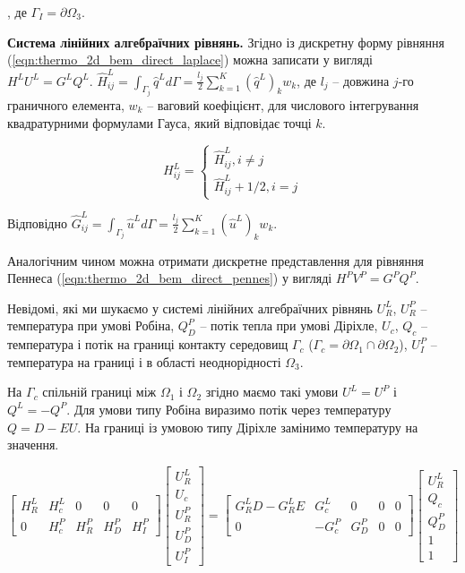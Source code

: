 \noindent, де $\Gamma_I = \partial \Omega_3$.

\textbf{Система лінійних алгебраїчних рівнянь.} Згідно із \cite{brebbia-bem} дискретну форму рівняння 
(\ref{eqn:thermo_2d_bem_direct_laplace}) можна записати у вигляді 
$H^LU^L=G^LQ^L$. $\hat{H}_{ij}^L=\int_{\Gamma_j} \hat{q}^L d \Gamma = \frac{l_j}{2} \sum_{k=1}^{K} (\hat{q}^L)_k w_k $,
де $l_j$ -- довжина $j$-го граничного елемента, $w_k$ -- ваговий коефіцієнт, для числового інтегрування квадратурними 
формулами Гауса, який відповідає точці $k$. 

$$H_{ij}^L=\begin{cases}
\hat{H}_{ij}^L, i \neq j \\
\hat{H}_{ij}^L + 1/2, i = j
\end{cases}
$$

\noindent Відповідно $\hat{G}_{ij}^L=\int_{\Gamma_j} \hat{u}^L d \Gamma = \frac{l_j}{2} 
\sum_{k=1}^{K} (\hat{u}^L)_k w_k$.

Аналогічним чином можна отримати дискретне представлення для рівняння Пеннеса (\ref{eqn:thermo_2d_bem_direct_pennes}) у 
вигляді $H^P V^P = G^P Q^P$.

Невідомі, які ми шукаємо у системі лінійних алгебраїчних рівнянь $U_R^L$, $U_R^P$ -- температура при умові Робіна, 
$Q_D^P$ -- потік тепла при умові Діріхле, $U_c$, $Q_c$ --температура і потік на границі контакту середовищ 
$\Gamma_c$ ($\Gamma_c = \partial \Omega_1 \cap \partial \Omega_2$), $U_I^P$ -- температура на границі і в області 
неоднорідності $\Omega_3$.

На $\Gamma_c$ спільній границі між $\Omega_1$ і $\Omega_2$ згідно \cite{brebbia-bem} маємо такі умови 
$U^L = U^P$ і $Q^L = -Q^P$. Для умови типу Робіна виразимо потік через температуру $Q = D - EU$. На границі із умовою 
типу Діріхле замінимо температуру на значення. 

\begin{equation*}
    \begin{bmatrix}
        H_R^L & H_c^L & 0 & 0 & 0 \\ 
        0 & H_c^P & H_R^P & H_D^P & H_I^P
    \end{bmatrix}
    \begin{bmatrix}
        U_R^L \\ 
        U_c \\
        U_R^P \\ 
        U_D^P \\ 
        U_I^P  
    \end{bmatrix} 
    = 
    \begin{bmatrix}
        G_R^LD-G_R^LE & G_c^L & 0 & 0 & 0\\ 
        0 & -G_c^P & G_D^P & 0 & 0
    \end{bmatrix}
    \begin{bmatrix}
        U_R^L \\
        Q_c \\
        Q_D^P \\
        1 \\
        1  
    \end{bmatrix} 
\end{equation*}

